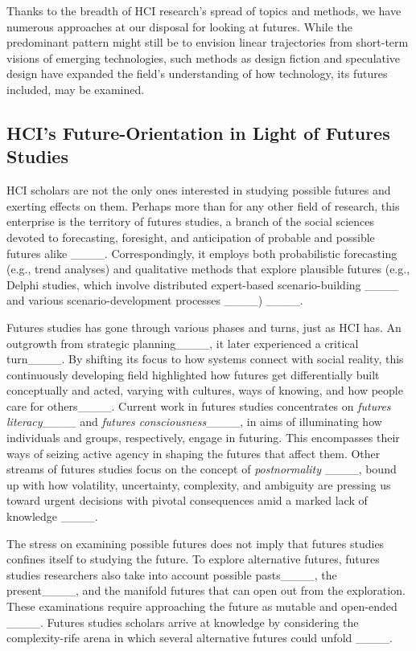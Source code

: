 Thanks to the breadth of HCI research's spread of topics and methods, we have numerous approaches at our disposal for looking at futures. While the predominant pattern might still be to envision linear trajectories from short-term visions of emerging technologies, such methods as design fiction and speculative design have expanded the field's understanding of how technology, its futures included, may be examined.  


\subsection{HCI's Future-Orientation in Light of Futures Studies}

HCI scholars are not the only ones interested in studying possible futures and exerting effects on them. Perhaps more than for any other field of research, this enterprise is the territory of futures studies, a branch of the social sciences devoted to forecasting, foresight, and anticipation of probable and possible futures alike ____. Correspondingly, it employs both probabilistic forecasting (e.g., trend analyses) and qualitative methods that explore plausible futures (e.g., Delphi studies, which involve distributed expert-based scenario-building ____ and various scenario-development processes ____) ____. 

Futures studies has gone through various phases and turns, just as HCI has. An outgrowth from strategic planning____, it later experienced a critical turn____. By shifting its focus to how systems connect with social reality, this continuously developing 
field highlighted how futures get differentially built conceptually and acted, varying with cultures, ways of knowing, and how people care for others____. 
Current work in futures studies concentrates on \textit{futures literacy}____ and \textit{futures consciousness}____, in aims of illuminating how individuals and groups, respectively, engage in futuring. This encompasses their ways of seizing active agency in shaping the futures that affect them. Other streams of futures studies focus on the concept of \textit{postnormality} ____, bound up with how volatility, uncertainty, complexity, and ambiguity are pressing us toward urgent decisions with pivotal consequences amid a marked lack of knowledge ____. 

The stress on examining possible futures does not imply that futures studies confines itself to studying the future. To explore alternative futures, futures studies researchers also take into account possible pasts____, the present____, and the manifold futures that can open out from the exploration. These examinations require approaching the future as mutable and open-ended ____. Futures studies scholars arrive at knowledge by considering the complexity-rife arena in which several alternative futures could unfold ____. 

